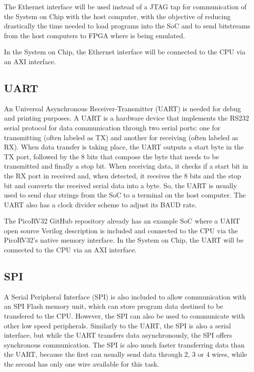 The Ethernet interface will be used instead of a JTAG tap for communication of
the \socname System on Chip with the host computer, with the objective of
reducing drastically the time needed to load programs into the SoC and to send
bitstreams from the host computers to FPGA where \socname is being emulated.

In the \socname System on Chip, the Ethernet interface will be connected to the
CPU via an AXI interface.


\subsection{UART}
\label{subsection:uart}

An Universal Asynchronous Receiver-Transmitter (UART) is needed for debug and
printing purposes. A UART is a hardware device that implements the RS232 serial
protocol for data communication through two serial ports: one for transmitting
(often labeled as TX) and another for receiving (often labeled as RX). When data
transfer is taking place, the UART outputs a start byte in the TX port, followed
by the 8 bits that compose the byte that needs to be transmitted and finally a
stop bit. When receiving data, it checks if a start bit in the RX port in
received and, when detected, it receives the 8 bits and the stop bit and
converts the received serial data into a byte. So, the UART is usually used to
send char strings from the SoC to a terminal on the host computer. The UART also
has a clock divider scheme to adjust its BAUD rate.

The PicoRV32 GitHub repository already has an example SoC where a UART open
source Verilog description is included and connected to the CPU via the
PicoRV32's native memory interface. In the \socname System on Chip, the UART
will be connected to the CPU via an AXI interface.


\subsection{SPI}
\label{subsection:spi}

A Serial Peripheral Interface (SPI) is also included to allow communication with
an SPI Flash memory unit, which can store program data destined to be transfered
to the CPU. However, the SPI can also be used to communicate with other low
speed peripherals. Similarly to the UART, the SPI is also a serial interface,
but while the UART transfers data asynchronously, the SPI offers synchronous
communication. The SPI is also much faster transferring data than the UART,
because the first can usually send data through 2, 3 or 4 wires, while the
second has only one wire available for this task.

